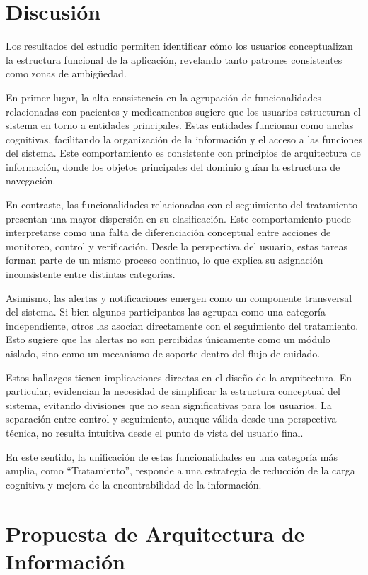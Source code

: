 \documentclass[11pt]{article}
\begin{document}
\newpage
\section{Discusión}

Los resultados del estudio permiten identificar cómo los usuarios conceptualizan la estructura funcional de la aplicación, revelando tanto patrones consistentes como zonas de ambigüedad.

En primer lugar, la alta consistencia en la agrupación de funcionalidades relacionadas con pacientes y medicamentos sugiere que los usuarios estructuran el sistema en torno a entidades principales. Estas entidades funcionan como anclas cognitivas, facilitando la organización de la información y el acceso a las funciones del sistema. Este comportamiento es consistente con principios de arquitectura de información, donde los objetos principales del dominio guían la estructura de navegación.

En contraste, las funcionalidades relacionadas con el seguimiento del tratamiento presentan una mayor dispersión en su clasificación. Este comportamiento puede interpretarse como una falta de diferenciación conceptual entre acciones de monitoreo, control y verificación. Desde la perspectiva del usuario, estas tareas forman parte de un mismo proceso continuo, lo que explica su asignación inconsistente entre distintas categorías.

Asimismo, las alertas y notificaciones emergen como un componente transversal del sistema. Si bien algunos participantes las agrupan como una categoría independiente, otros las asocian directamente con el seguimiento del tratamiento. Esto sugiere que las alertas no son percibidas únicamente como un módulo aislado, sino como un mecanismo de soporte dentro del flujo de cuidado.

Estos hallazgos tienen implicaciones directas en el diseño de la arquitectura. En particular, evidencian la necesidad de simplificar la estructura conceptual del sistema, evitando divisiones que no sean significativas para los usuarios. La separación entre control y seguimiento, aunque válida desde una perspectiva técnica, no resulta intuitiva desde el punto de vista del usuario final.

En este sentido, la unificación de estas funcionalidades en una categoría más amplia, como “Tratamiento”, responde a una estrategia de reducción de la carga cognitiva y mejora de la encontrabilidad de la información.

\section{Propuesta de Arquitectura de Información}
\end{document}
